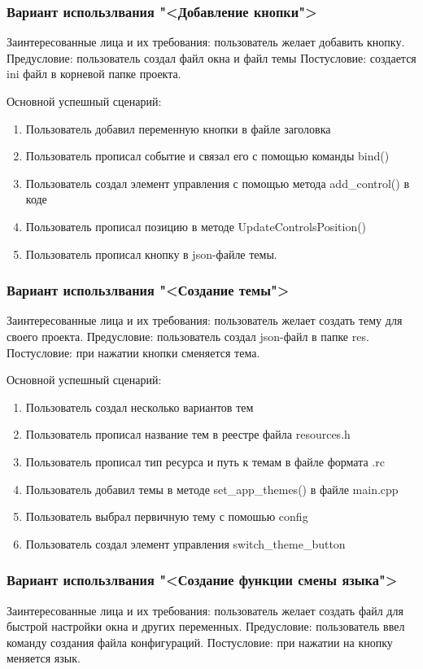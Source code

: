 \subsubsection{Вариант использлвания "<Добавление кнопки">}
Заинтересованные лица и их требования: пользователь желает добавить кнопку.
Предусловие: пользователь создал файл окна и файл темы
Постусловие: создается ini файл в корневой папке проекта.

Основной успешный сценарий:
\begin{enumerate}
	\item Пользователь добавил переменную кнопки в файле заголовка
	\item Пользователь прописал событие и связал его с помощью команды bind()
	\item Пользователь создал элемент управления с помощью метода add{\_}control() в коде
	\item Пользователь прописал позицию в методе UpdateControlsPosition() 
	\item Пользователь прописал кнопку в json-файле темы.
\end{enumerate}

\subsubsection{Вариант использлвания "<Создание темы">}
Заинтересованные лица и их требования: пользователь желает создать тему для своего проекта.
Предусловие: пользователь создал json-файл в папке res.
Постусловие: при нажатии кнопки сменяется тема.

Основной успешный сценарий:
\begin{enumerate}
	\item Пользователь создал несколько вариантов тем
	\item Пользователь прописал название тем в реестре файла resources.h
	\item Пользователь прописал тип ресурса и путь к темам в файле формата .rc
	\item Пользователь добавил темы в методе set{\_}app{\_}themes() в файле main.cpp
	\item Пользователь выбрал первичную тему с помошью config
	\item Пользователь создал элемент управления switch{\_}theme{\_}button
\end{enumerate}

\subsubsection{Вариант использлвания "<Создание функции смены языка">}
Заинтересованные лица и их требования: пользователь желает создать файл для быстрой настройки окна и других переменных.
Предусловие: пользователь ввел команду создания файла конфигураций.
Постусловие: при нажатии на кнопку меняется язык.

